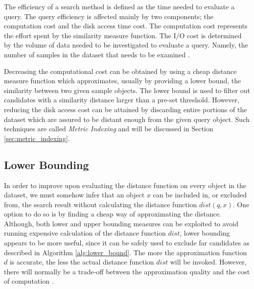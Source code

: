 \iftoggle{edit-mode}{\hspace{0pt}\marginpar{Problems - similarity search costs}}{}
The efficiency of a search method is defined as the time needed to evaluate a query. 
The query efficiency is affected mainly by two components; the computation cost and the disk access time cost. 
The computation cost represents the effort spent by the similarity measure function. 
The I/O cost is determined by the volume of data needed to be investigated to evaluate a query. Namely, the number of samples in the dataset that needs to be examined \cite{saabni2013efficient}.

\iftoggle{edit-mode}{\hspace{0pt}\marginpar{Solution directions}}{}
Decreasing the computational cost can be obtained by using a cheap distance measure function which approximates, usually by providing a lower bound, the similarity between two given sample objects. 
The lower bound is used to filter out candidates with a similarity distance larger than a pre-set threshold. 
However, reducing the disk access cost can be attained by discarding entire portions of the dataset which are assured to be distant enough from the given query object. 
Such techniques are called \emph{Metric Indexing} and will be discussed in Section \ref{sec:metric_indexing}.


\subsection{Lower Bounding}
\label{subsec:lower_bounding}
\iftoggle{edit-mode}{\hspace{0pt}\marginpar{Distance function approximation}}{}
In order to improve upon evaluating the distance function on every object in the dataset, we must somehow infer that an object $x$ can be included in, or excluded from, the search result without calculating the distance function $dist(q, x)$. One option to do so is by finding a cheap way of approximating the distance. Although, both lower and upper bounding measures can be exploited to avoid running expensive calculation of the distance function $dist$, lower bounding appears to be more useful, since it can be safely used to exclude far candidates as described in Algorithm \ref{alg:lower_bound}. The more the approximation function $d$ is accurate, the less the actual distance function $dist$ will be invoked. However, there will normally be a trade-off between the approximation quality and the cost of computation \cite{hetland2009basic, keogh2005exact}.

